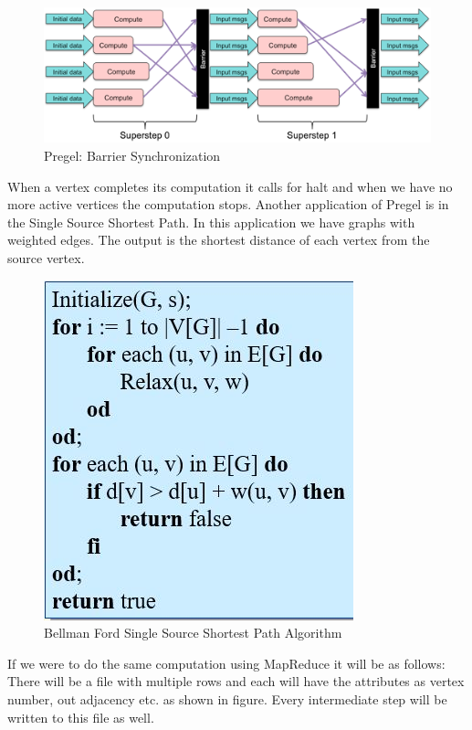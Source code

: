 \documentclass[twoside]{article}
\begin{document}
\begin{figure}[ht]
  \centering
  \includegraphics[width=0.7\linewidth]{Pregel-barrier-sync.png}
  \caption{Pregel: Barrier Synchronization}
  \vspace{-0.2cm}
  \label{fig:blockdiagram}
  \vspace{-0.2cm}
\end{figure}

 When a vertex completes its computation it calls for halt and when we have no more
active vertices the computation stops.
Another application of Pregel is in the Single Source Shortest Path. In this application we have graphs with
weighted edges. The output is the shortest distance of each vertex from the source vertex.

\begin{figure}[ht]
  \centering
  \includegraphics[width=0.7\linewidth]{BellmanFord-algorithm.jpg}
  \caption{Bellman Ford Single Source Shortest Path Algorithm}
  \vspace{-0.2cm}
  \label{fig:blockdiagram}
  \vspace{-0.2cm}
\end{figure}

If we were to do the same computation using MapReduce it will be as follows: There will be a file with multiple rows and each will have the attributes as vertex number, out adjacency etc. as shown in figure.
Every intermediate step will be written to this file as well.
\end{document}
